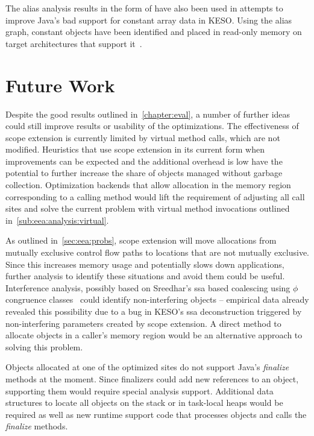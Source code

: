 	The alias analysis results in the form of  have also been used in attempts to improve Java's bad support
	for constant array data in KESO\@. Using the alias graph, constant objects have been identified and placed in read-only
	memory on target architectures that support it~\cite{kuhnle:14}.

	\section*{Future Work}
		\label{sec:conclusion:future-work}
		Despite the good results outlined in~\cref{chapter:eval}, a number of further ideas could still improve results or
		usability of the optimizations. The effectiveness of scope extension is currently limited by virtual method calls,
		which are not modified. Heuristics that use scope extension in its current form when improvements can be expected
		and the additional overhead is low have the potential to further increase the share of objects managed without
		garbage collection. Optimization backends that allow allocation in the memory region corresponding to a calling
		method would lift the requirement of adjusting all call sites and solve the current problem with virtual method
		invocations outlined in~\cref{sub:eea:analysis:virtual}.

		As outlined in~\cref{sec:eea:probs}, scope extension will move allocations from mutually exclusive control flow
		paths to locations that are not mutually exclusive. Since this increases memory usage and potentially slows down
		applications, further analysis to identify these situations and avoid them could be useful. Interference analysis,
		possibly based on Sreedhar's \gls{ssa} based coalescing using $\phi$ congruence classes~\cite{sreedhar:99:sas} could
		identify non-interfering objects – empirical data already revealed this possibility due to a bug in KESO's \gls{ssa}
		deconstruction triggered by non-interfering parameters created by scope extension. A direct method to allocate
		objects in a caller's memory region would be an alternative approach to solving this problem.

		Objects allocated at one of the optimized sites do not support Java's \emph{finalize} methods at the moment. Since
		finalizers could add new references to an object, supporting them would require special analysis support. Additional
		data structures to locate all objects on the stack or in task-local heaps would be required as well as new runtime
		support code that processes objects and calls the \emph{finalize} methods.

